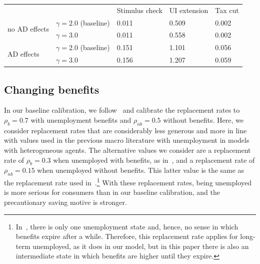 \documentclass{econsocart}
\begin{document}
\begin{center}
  \begin{tabular}
    {@{}lllll@{}}
    \toprule
     &                           & Stimulus check & UI extension & Tax cut \\ \cmidrule(l){1-5}
    \multirow{2}{*}{no AD effects}
     & $\gamma = 2.0$ (baseline) & 0.011          & 0.509        & 0.002   \\
     & $\gamma = 3.0$            & 0.011          & 0.558        & 0.002   \\ \cmidrule(l){1-5}
    \multirow{2}{*}{AD effects}
     & $\gamma = 2.0$ (baseline) & 0.151          & 1.101        & 0.056   \\
     & $\gamma = 3.0$            & 0.156          & 1.207        & 0.059   \\ \cmidrule(l){1-5}
  \end{tabular}
  \label{tab:robustness_gamma_results}
\end{center}

\hypertarget{changing-benefits}{}\subsection*{Changing benefits}
\whenintegrated{\label{sec:robust_benefits}} %

In our baseline calibration, we follow~\cite{rothstein2017scraping} and calibrate the replacement rates to $\rho_b=0.7$ with unemployment benefits and $\rho_{nb}=0.5$ without benefits.
Here, we consider replacement rates that are considerably less generous and more in line with values used in the previous macro literature with unemployment in models with heterogeneous agents.
The alternative values we consider are a replacement rate of $\rho_{b}=0.3$ when unemployed with benefits, as in~\cite{carroll2020modeling}, and a replacement rate of $\rho_{nb}=0.15$ when unemployed without benefits.
This latter value is the same as the replacement rate used in~\cite{den2010computational}.\footnote{In~\cite{den2010computational}, there is only one unemployment state and, hence, no sense in which benefits expire after a while.
  Therefore, this replacement rate applies for long-term unemployed, as it does in our model, but in this paper there is also an intermediate state in which benefits are higher until they expire.} With these replacement rates, being unemployed is more serious for consumers than in our baseline calibration, and the precautionary saving motive is stronger.
\end{document}
